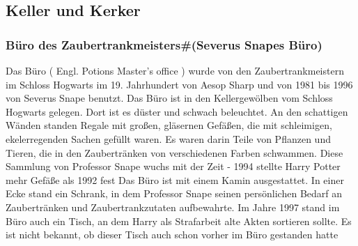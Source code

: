 \documentclass[a4paper, 10pt]{article}
\begin{document}
\subsection*{\Large Keller und Kerker}
\subsubsection*{\large Büro des Zaubertrankmeisters#(Severus Snapes Büro)}
Das Büro (  Engl.  Potions Master's office ) wurde von den Zaubertrankmeistern im Schloss Hogwarts im 19. Jahrhundert von Aesop Sharp und von 1981 bis 1996 von Severus Snape benutzt. Das Büro ist in den Kellergewölben vom Schloss Hogwarts gelegen. Dort ist es düster und schwach beleuchtet. An den schattigen Wänden standen Regale mit großen, gläsernen Gefäßen, die mit schleimigen, ekelerregenden Sachen gefüllt waren. Es waren darin Teile von Pflanzen und Tieren, die in den Zaubertränken von verschiedenen Farben schwammen. Diese Sammlung von Professor Snape wuchs mit der Zeit - 1994 stellte Harry Potter mehr Gefäße als 1992 fest
\vspace{10pt}
\newline
{}  
Das Büro ist mit einem Kamin ausgestattet. In einer Ecke stand ein Schrank, in dem Professor Snape seinen persönlichen Bedarf an Zaubertränken und Zaubertrankzutaten aufbewahrte. Im Jahre 1997 stand im Büro auch ein Tisch, an dem Harry als Strafarbeit alte Akten sortieren sollte. Es ist nicht bekannt, ob dieser Tisch auch schon vorher im Büro gestanden hatte
\end{document}
